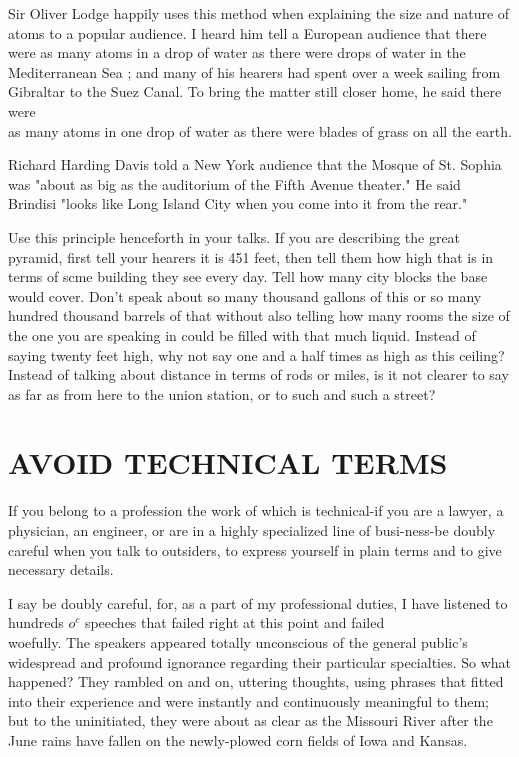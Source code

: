 \documentclass[10pt]{article}
\begin{document}
Sir Oliver Lodge happily uses this method when explaining the size and nature of atoms to a popular audience. I heard him tell a European audience that there were as many atoms in a drop of water as there were drops of water in the Mediterranean Sea ; and many of his hearers had spent over a week sailing from Gibraltar to the Suez Canal. To bring the matter still closer home, he said there were\\
as many atoms in one drop of water as there were blades of grass on all the earth.

Richard Harding Davis told a New York audience that the Mosque of St. Sophia was "about as big as the auditorium of the Fifth Avenue theater." He said Brindisi "looks like Long Island City when you come into it from the rear."

Use this principle henceforth in your talks. If you are describing the great pyramid, first tell your hearers it is 451 feet, then tell them how high that is in terms of scme building they see every day. Tell how many city blocks the base would cover. Don't speak about so many thousand gallons of this or so many hundred thousand barrels of that without also telling how many rooms the size of the one you are speaking in could be filled with that much liquid. Instead of saying twenty feet high, why not say one and a half times as high as this ceiling? Instead of talking about distance in terms of rods or miles, is it not clearer to say as far as from here to the union station, or to such and such a street?

\section*{AVOID TECHNICAL TERMS}
If you belong to a profession the work of which is technical-if you are a lawyer, a physician, an engineer, or are in a highly specialized line of busi-ness-be doubly careful when you talk to outsiders, to express yourself in plain terms and to give necessary details.

I say be doubly careful, for, as a part of my professional duties, I have listened to hundreds $o^{c}$ speeches that failed right at this point and failed\\
woefully. The speakers appeared totally unconscious of the general public's widespread and profound ignorance regarding their particular specialties. So what happened? They rambled on and on, uttering thoughts, using phrases that fitted into their experience and were instantly and continuously meaningful to them; but to the uninitiated, they were about as clear as the Missouri River after the June rains have fallen on the newly-plowed corn fields of Iowa and Kansas.
\end{document}
